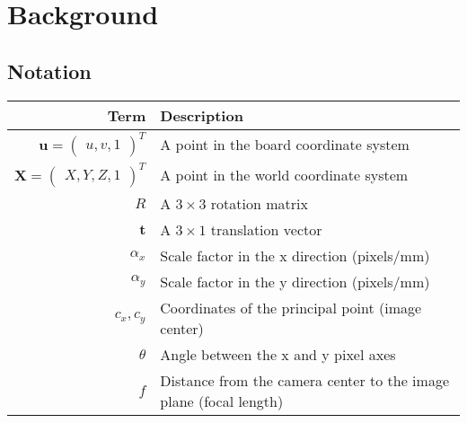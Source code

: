 \chapter{Background}\label{cha:background}

\section{Notation}\label{sec:notation}

\begin{table}[htbp]
	\label{tab:notation}
	\centering
	\begin{tabular}{rl}
		\toprule
		Term                           & Description                                                                                            \\
		\midrule
		\(\mathbf{u} = \begin{pmatrix}
			               u, v, 1
		               \end{pmatrix}^{T}\) & A point in the board coordinate system                                                             \\
		\(\mathbf{X} = \begin{pmatrix}
			               X, Y, Z, 1
		               \end{pmatrix}^{T}\) & A point in the world coordinate system                                                             \\
		\(R\)                          & A \(3 \times 3\) rotation matrix                                                                       \\
		\(\mathbf{t}\)                 & A \(3 \times 1\) translation vector                                                                    \\
		\(\alpha_x\)                   & Scale factor in the x direction (pixels/mm)                                                            \\
		\(\alpha_y\)                   & Scale factor in the y direction (pixels/mm)                                                            \\
		\(c_x, c_y\)                   & Coordinates of the principal point (image center)                                                      \\
		\(\theta\)                     & Angle between the x and y pixel axes                                                                   \\
		\(f\)                          & Distance from the camera center to the image plane (focal length)                                      \\

\end{tabular}
\end{table}
